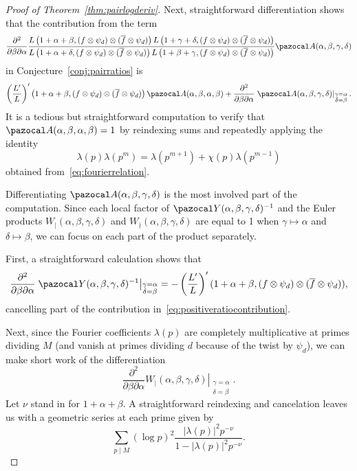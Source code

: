 \documentclass[11pt,reqno]{amsart} \usepackage{fullpage}
\newcommand\be{\begin{equation}}
\newcommand\ee{\end{equation}}
\numberwithin{equation}{section}
\begin{document}
\begin{proof}[Proof of Theorem~\ref{thm:pairlogderiv}]
  Next, straightforward differentiation shows that the contribution from the term
  \be\frac{\partial^2}{\partial\beta\partial\alpha}
  \frac{L\left(1+\alpha+\beta,(f\otimes\psi_d)\otimes(\overline f\otimes\psi_d)\right)
    L\left(1+\gamma+\delta,(f\otimes\psi_d)\otimes(\overline f\otimes\psi_d)\right)}
  {L\left(1+\alpha+\delta,(f\otimes\psi_d)\otimes(\overline f\otimes\psi_d)\right)
    L\left(1+\beta+\gamma,(f\otimes\psi_d)\otimes(\overline f\otimes\psi_d)\right)}
  \pazocal A(\alpha,\beta,\gamma,\delta)\ee in Conjecture~\ref{conj:pairratios}
  is \be\label{eq:positiveratiocontribution}
  \left(\frac{L'}{L}\right)'
  \left(1+\alpha+\beta,(f\otimes\psi_d)\otimes(\overline f\otimes\psi_d)\right)
  \pazocal A(\alpha,\beta,\alpha,\beta)+
  \frac{\partial^2}{\partial\beta\partial\alpha}\left.\pazocal
    A(\alpha,\beta,\gamma,\delta)\right|_{\substack{\gamma=\alpha\\\delta=\beta}}.\ee
  It is a tedious but straightforward computation to verify that
  $\pazocal A(\alpha,\beta,\alpha,\beta)=1$ by reindexing sums and repeatedly applying the
  identity \be\label{eq:lambdamagic}
  \lambda(p)\lambda(p^m)=\lambda(p^{m+1})+\chi(p)\lambda(p^{m-1})\ee
  obtained from~\eqref{eq:fourierrelation}.

  Differentiating $\pazocal A(\alpha,\beta,\gamma,\delta)$ is the most involved part of the
  computation. Since each local factor of
  $\pazocal Y(\alpha,\beta,\gamma,\delta)^{-1}$ and the Euler products
  $W_\mid(\alpha,\beta,\gamma,\delta)$ and $W_\nmid(\alpha,\beta,\gamma,\delta)$
  are equal to 1 when $\gamma\mapsto\alpha$ and $\delta\mapsto\beta$,
  we can focus on each part of the product separately.

  First, a straightforward calculation shows that
  \be\frac{\partial^2}{\partial\beta\partial\alpha}
  \left.\pazocal Y(\alpha,\beta,\gamma,\delta)^{-1}
  \right|_{\substack{\gamma=\alpha\\\delta=\beta}}
  =-\left(\frac{L'}L\right)'
  (1+\alpha+\beta,(f\otimes\psi_d)\otimes(\overline f\otimes\psi_d)),\ee
  cancelling part of the contribution in~\eqref{eq:positiveratiocontribution}.

  Next, since the Fourier coefficients $\lambda(p)$ are completely multiplicative at
  primes dividing $M$ (and vanish at primes dividing $d$ because of the twist by $\psi_d$),
  we can make short work of the differentiation
  \be\frac{\partial^2}{\partial\beta\partial\alpha}\left.
    W_\mid(\alpha,\beta,\gamma,\delta)\right|_{\substack{\gamma=\alpha\\\delta=\beta}}.\ee
  Let $\nu$ stand in for $1+\alpha+\beta$. A straightforward reindexing and cancelation
  leaves us with a geometric series at each prime given by
  \be\sum_{p\mid M}(\log p)^2\frac{\left|\lambda(p)\right|^2p^{-\nu}}
  {1-\left|\lambda(p)\right|^2p^{-\nu}}.\ee


\end{proof}
\end{document}
